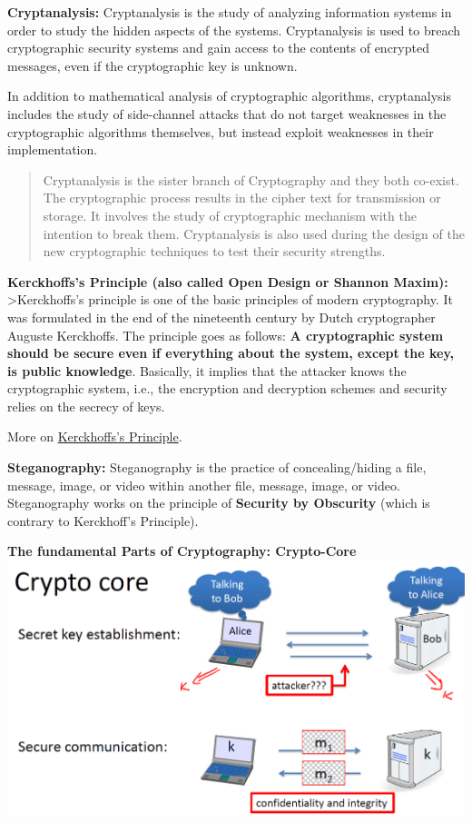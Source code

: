 \documentclass[11pt]{article}
\makeatletter
\def\maxwidth{\ifdim\Gin@nat@width>\linewidth\linewidth
    \else\Gin@nat@width\fi}
\let\Oldincludegraphics\includegraphics
\renewcommand{\includegraphics}[1]{\Oldincludegraphics[width=.8\maxwidth]{#1}}
\makeatother
\begin{document}
\textbf{Cryptanalysis:} Cryptanalysis is the study of analyzing
information systems in order to study the hidden aspects of the systems.
Cryptanalysis is used to breach cryptographic security systems and gain
access to the contents of encrypted messages, even if the cryptographic
key is unknown.

In addition to mathematical analysis of cryptographic algorithms,
cryptanalysis includes the study of side-channel attacks that do not
target weaknesses in the cryptographic algorithms themselves, but
instead exploit weaknesses in their implementation.

\begin{quote}
Cryptanalysis is the sister branch of Cryptography and they both
co-exist. The cryptographic process results in the cipher text for
transmission or storage. It involves the study of cryptographic
mechanism with the intention to break them. Cryptanalysis is also used
during the design of the new cryptographic techniques to test their
security strengths.
\end{quote}

\textbf{Kerckhoffs's Principle (also called Open Design or Shannon
Maxim):} \textgreater{}Kerckhoffs's principle is one of the basic
principles of modern cryptography. It was formulated in the end of the
nineteenth century by Dutch cryptographer Auguste Kerckhoffs. The
principle goes as follows: \textbf{A cryptographic system should be
secure even if everything about the system, except the key, is public
knowledge}. Basically, it implies that the attacker knows the
cryptographic system, i.e., the encryption and decryption schemes and
security relies on the secrecy of keys.

More on
\href{http://www.crypto-it.net/eng/theory/kerckhoffs.html}{Kerckhoffs's
Principle}.

\textbf{Steganography:} Steganography is the practice of
concealing/hiding a file, message, image, or video within another file,
message, image, or video. Steganography works on the principle of
\textbf{Security by Obscurity} (which is contrary to Kerckhoff's
Principle).

\textbf{The fundamental Parts of Cryptography: Crypto-Core}
\includegraphics{./Images/CryptoCore.png}
\end{document}
